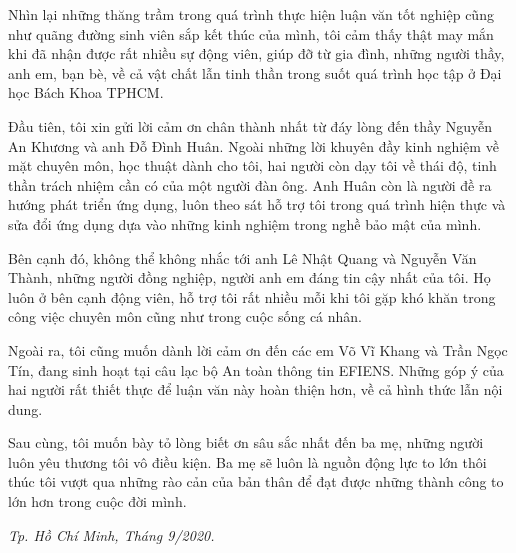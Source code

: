 \cleardoublepage
{}
\begin{dedication}
Nhìn lại những thăng trầm trong quá trình thực hiện luận văn tốt nghiệp cũng như quãng đường sinh viên sắp kết thúc của mình, tôi cảm thấy thật may mắn khi đã nhận được rất nhiều sự động viên, giúp đỡ từ gia đình, những người thầy, anh em, bạn bè, về cả vật chất lẫn tinh thần trong suốt quá trình học tập ở Đại học Bách Khoa TPHCM.\par
Đầu tiên, tôi xin gửi lời cảm ơn chân thành nhất từ đáy lòng đến thầy Nguyễn An Khương và anh Đỗ Đình Huân. Ngoài những lời khuyên đầy kinh nghiệm về mặt chuyên môn, học thuật dành cho tôi, hai người còn dạy tôi về thái độ, tinh thần trách nhiệm cần có của một người đàn ông. Anh Huân còn là người đề ra hướng phát triển ứng dụng, luôn theo sát hỗ trợ tôi trong quá trình hiện thực và sửa đổi ứng dụng dựa vào những kinh nghiệm trong nghề bảo mật của mình.\par
Bên cạnh đó, không thể không nhắc tới anh Lê Nhật Quang và Nguyễn Văn Thành, những người đồng nghiệp, người anh em đáng tin cậy nhất của tôi. Họ luôn ở bên cạnh động viên, hỗ trợ tôi rất nhiều mỗi khi tôi gặp khó khăn trong công việc chuyên môn cũng như trong cuộc sống cá nhân.\par
Ngoài ra, tôi cũng muốn dành lời cảm ơn đến các em Võ Vĩ Khang và Trần Ngọc Tín, đang sinh hoạt tại câu lạc bộ An toàn thông tin EFIENS. Những góp ý của hai người rất thiết thực để luận văn này hoàn thiện hơn, về cả hình thức lẫn nội dung.\par
Sau cùng, tôi muốn bày tỏ lòng biết ơn sâu sắc nhất đến ba mẹ, những người luôn yêu thương tôi vô điều kiện. Ba mẹ sẽ luôn là nguồn động lực to lớn thôi thúc tôi vượt qua những rào cản của bản thân để đạt được những thành công to lớn hơn trong cuộc đời mình.
\begin{flushright}
    \textit{Tp. Hồ Chí Minh, Tháng 9/2020.}
\end{flushright}
\end{dedication}
